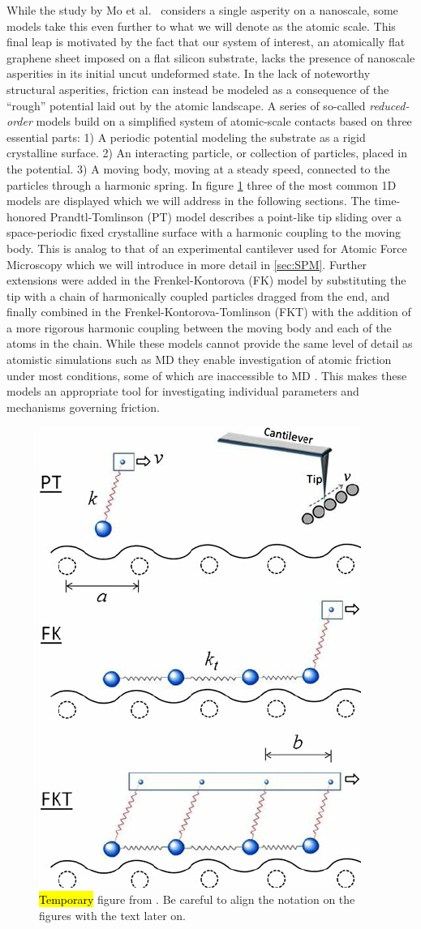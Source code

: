 While the study by Mo et al.\ \cite{mo_friction_2009} considers a single
asperity on a nanoscale, some models take this even further to what we will
denote as the atomic scale. This final leap is motivated by the fact that our
system of interest, an atomically flat graphene sheet imposed on a flat silicon
substrate, lacks the presence of nanoscale asperities in its initial uncut
undeformed state. In the lack of noteworthy structural asperities, friction can
instead be modeled as a consequence of the ``rough'' potential laid out by
the atomic landscape. A series of so-called \textit{reduced-order} models build on a
simplified system of atomic-scale contacts based on three essential parts: 1) A
periodic potential modeling the substrate as a rigid crystalline surface. 2) An
interacting particle, or collection of particles, placed in the potential. 3) A
moving body, moving at a steady speed, connected to the particles through a
harmonic spring. In figure \cref{fig:PT_FK_FKT} three of the most common 1D
models are displayed which we will address in the following sections. The
time-honored Prandtl-Tomlinson (PT) model describes a point-like tip sliding
over a space-periodic fixed crystalline surface with a harmonic coupling to the
moving body. This is analog to that of an experimental cantilever used for
Atomic Force Microscopy which we will introduce in more detail in
\cref{sec:SPM}. Further extensions were added in the Frenkel-Kontorova
(\acrshort{FK}) model by substituting the tip with a chain of harmonically coupled
particles dragged from the end, and finally combined in the
Frenkel-Kontorova-Tomlinson (\acrshort{FKT}) with the addition of a more
rigorous harmonic coupling between the moving body and each of the atoms in the
chain. While these models cannot provide the same level of detail as atomistic
simulations such as \acrshort{MD} they enable investigation of atomic friction
under most conditions, some of which are inaccessible to \acrshort{MD}
\cite{Yalin_2011}. This makes these models an appropriate tool for investigating
individual parameters and mechanisms governing friction.


\begin{figure}[H]
  \centering
  \includegraphics[width=0.4\linewidth]{figures/theory/PT_FK_FKT.png}
  \caption{\hl{Temporary} figure from \cite{Yalin_2011}. Be careful to align the notation on the figures with the text later on.}
  \label{fig:PT_FK_FKT}
\end{figure}



